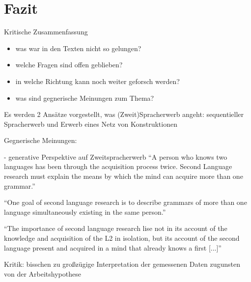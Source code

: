 \section{Fazit}

\begin{comment}
    * Einleitung und Fazit müssen zusammenpassen.
    * sind die Erkenntnisse im Fazit aus der Arbeit ableitbar?
    * Vorgehensweise zusammenfassen
\end{comment}

Kritische Zusammenfassung
\begin{itemize}
    \item was war in den Texten nicht so gelungen?
    \item welche Fragen sind offen geblieben?
    \item in welche Richtung kann noch weiter geforsch werden?
    \item was sind gegnerische Meinungen zum Thema?
\end{itemize}

Es werden 2 Ansätze vorgestellt, was (Zweit)Spracherwerb angeht: sequentieller Spracherwerb und Erwerb eines Netz von Konstruktionen

Gegnerische Meinungen:

\cite{Cook93} - generative Perspektive auf Zweitspracherwerb
``A person who knows two languages has been through the acquisition process twice.
Second Language research must explain the means by which the mind can acquire more than one grammar.''

``One goal of second language research is to describe grammars of more than one language simultaneously existing in the same person.''

``The importance of second language research lise not in its account of the knowledge and acquisition of the L2 in isolation, but its account of the second language present and acquired in a mind that already knows a first [...]''


\cite{Valenzuela05} Kritik:
bisschen zu großzügige Interpretation der gemessenen Daten zugunsten von der Arbeitshypothese


